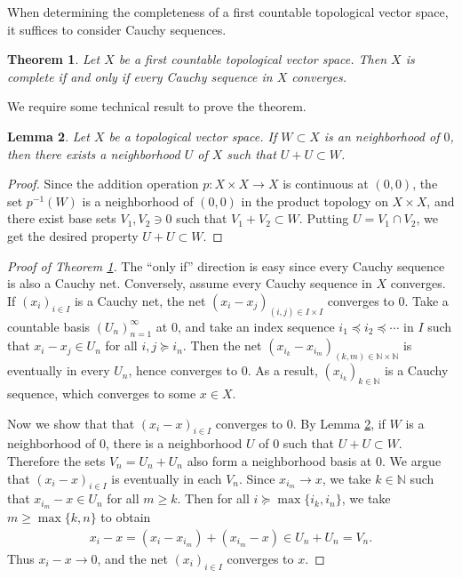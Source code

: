 \documentclass{article}
\numberwithin{equation}{section}
\newcommand{\bbN}{\mathbb{N}}
\theoremstyle{plain}
\newtheorem{theorem}{Theorem}[section]
\newtheorem{lemma}[theorem]{Lemma}
\theoremstyle{definition}
\begin{document}
When determining the completeness of a first countable topological vector space, it suffices to consider Cauchy sequences.
\begin{theorem}\label{1ctcauchy}
	Let $X$ be a first countable topological vector space. Then $X$ is complete if and only if every Cauchy sequence in $X$ converges.
\end{theorem}
We require some technical result to prove the theorem.
\begin{lemma}\label{1ctcauchylemma}
	Let $X$ be a topological vector space. If $W\subset X$ is an neighborhood of $0$, then there exists a neighborhood $U$ of $X$ such that $U+U\subset W$.
\end{lemma}
\begin{proof}
Since the addition operation $p:X\times X\to X$ is continuous at $(0,0)$, the set $p^{-1}(W)$ is a neighborhood of $(0,0)$ in the product topology on $X\times X$, and there exist base sets $V_1,V_2\ni 0$ such that $V_1+V_2\subset W$. Putting $U=V_1\cap V_2$, we get the desired property $U+U\subset W$.
\end{proof}
\begin{proof}[Proof of Theorem \ref{1ctcauchy}]
The ``only if'' direction is easy since every Cauchy sequence is also a Cauchy net. Conversely, assume every Cauchy sequence in $X$ converges. If $(x_i)_{i\in I}$ is a Cauchy net, the net $(x_i-x_j)_{(i,j)\in I\times I}$ converges to $0$. 
Take a countable basis $(U_n)_{n=1}^\infty$ at $0$, and take an index sequence $i_1\preceq i_2\preceq\cdots$ in $I$ such that $x_i-x_j\in U_n$ for all $i,j\succeq i_n$. Then the net $(x_{i_k}-x_{i_m})_{(k,m)\in\bbN\times\bbN}$ is eventually in every $U_n$, hence converges to $0$. As a result, $(x_{i_k})_{k\in\bbN}$ is a Cauchy sequence, which converges to some $x\in X$.

Now we show that that $(x_i-x)_{i\in I}$ converges to $0$. By Lemma \ref{1ctcauchylemma}, if $W$ is a neighborhood of $0$, there is a neighborhood $U$ of $0$ such that $U+U\subset W$. Therefore the sets $V_n=U_n+U_n$ also form a neighborhood basis at $0$. We argue that $(x_i-x)_{i\in I}$ is eventually in each $V_n$. Since $x_{i_m}\to x$, we take $k\in\bbN$ such that $x_{i_m}-x\in U_n$ for all $m\geq k$. Then for all $i\succeq\max\{i_k,i_n\}$, we take $m\geq\max\{k,n\}$ to obtain
\begin{align*}
	x_i - x=(x_i-x_{i_m})+(x_{i_m}-x)\in U_n+U_n=V_n.
\end{align*}
Thus $x_i-x\to 0$, and the net $(x_i)_{i\in I}$ converges to $x$.
\end{proof}
\end{document}
